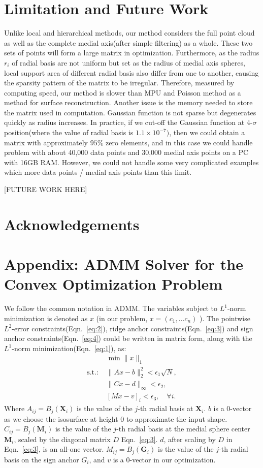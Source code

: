 \documentclass[annual]{acmsiggraph}
\begin{document}
\section{Limitation and Future Work}
Unlike local and hierarchical methods, our method considers the full point cloud as well as the complete medial axis(after simple filtering) as a whole. These two sets of points will form a large matrix in optimization. Furthermore, as the radius $r_i$ of radial basis are not uniform but set as the radius of medial axis spheres, local support area of different radial basis also differ from one to another, causing the sparsity pattern of the matrix to be irregular. Therefore, measured by computing speed, our method is slower than MPU and Poisson method as a method for surface reconstruction. Another issue is the memory needed to store the matrix used in computation. Gaussian function is not sparse but degenerates quickly as radius increases. In practice, if we cut-off the Gaussian function at 4-$\sigma$ position(where the value of radial basis is $1.1\times 10^{-7})$, then we could obtain a matrix with approximately $95\%$ zero elements, and in this case we could handle problem with about 40,000 data points and 30,000 medial axis points on a PC with 16GB RAM. However, we could not handle some very complicated examples which more data points / medial axis points than this limit. 

[FUTURE WORK HERE]

\section*{Acknowledgements}

\section*{Appendix: ADMM Solver for the Convex Optimization Problem}
We follow the common notation in ADMM. The variables subject to $L^1$-norm minimization is denoted as $x$ (in our problem, $x=(c_1,...c_n)$ ). The pointwise $L^2$-error constraints(Eqn.~\ref{eq:2}), ridge anchor constraints(Eqn.~\ref{eq:3}) and sign anchor constraints(Eqn.~\ref{eq:4}) could be written in matrix form, along with the $L^1$-norm minimization(Eqn.~\ref{eq:1}), as:
\begin{align}
&\min\|x\|_1\\
\mbox{s.t.: }&\|Ax-b\|_2^2<\epsilon_1\sqrt{N},\\
&\|Cx-d\|_{\infty}<\epsilon_2,\\
&[Mx-v]_i<\epsilon_3,\quad\forall i.
\end{align}
Where $A_{ij}=B_j(\mathbf{X}_i)$ is the value of the $j$-th radial basis at $\mathbf{X}_i$. $b$ is a 0-vector as we choose the isosurface at height 0 to approximate the input shape. $C_{ij}=B_j(\mathbf{M}_i)$ is the value of the $j$-th radial basis at the medial sphere center $\mathbf{M}_i$, scaled by the diagonal matrix $D$ Eqn.~\ref{eq:3}. $d$, after scaling by $D$ in Eqn.~\ref{eq:3}, is an all-one vector. $M_{ij}=B_j(\mathbf{G}_i)$ is the value of the $j$-th radial basis on the sign anchor $G_i$, and $v$ is a 0-vector in our optimization.
\end{document}
